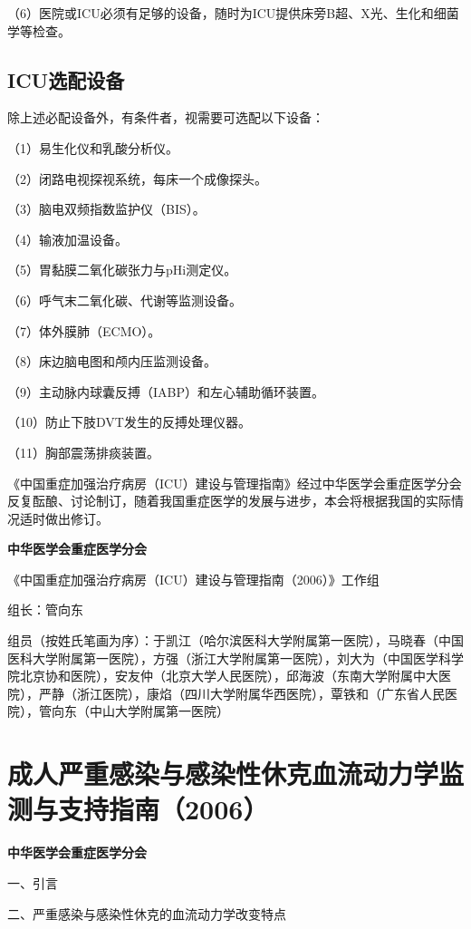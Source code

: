 （6）医院或ICU必须有足够的设备，随时为ICU提供床旁B超、X光、生化和细菌学等检查。

\section{ICU选配设备}

除上述必配设备外，有条件者，视需要可选配以下设备：

（1）易生化仪和乳酸分析仪。

（2）闭路电视探视系统，每床一个成像探头。

（3）脑电双频指数监护仪（BIS）。

（4）输液加温设备。

（5）胃黏膜二氧化碳张力与pHi测定仪。

（6）呼气末二氧化碳、代谢等监测设备。

（7）体外膜肺（ECMO）。

（8）床边脑电图和颅内压监测设备。

（9）主动脉内球囊反搏（IABP）和左心辅助循环装置。

（10）防止下肢DVT发生的反搏处理仪器。

（11）胸部震荡排痰装置。

《中国重症加强治疗病房（ICU）建设与管理指南》经过中华医学会重症医学分会反复酝酿、讨论制订，随着我国重症医学的发展与进步，本会将根据我国的实际情况适时做出修订。

\textbf{中华医学会重症医学分会}

《中国重症加强治疗病房（ICU）建设与管理指南（2006）》工作组

组长：管向东

组员（按姓氏笔画为序）：于凯江（哈尔滨医科大学附属第一医院），马晓春（中国医科大学附属第一医院），方强（浙江大学附属第一医院），刘大为（中国医学科学院北京协和医院），安友仲（北京大学人民医院），邱海波（东南大学附属中大医院），严静（浙江医院），康焰（四川大学附属华西医院），覃铁和（广东省人民医院），管向东（中山大学附属第一医院）

\protect\hypertarget{text00033.html}{}{}

\chapter{成人严重感染与感染性休克血流动力学监测与支持指南（2006）}

\textbf{中华医学会重症医学分会}

一、引言

二、严重感染与感染性休克的血流动力学改变特点


